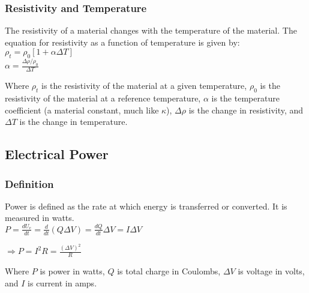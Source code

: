 \subsubsection*{Resistivity and Temperature}

\hspace{.5cm} The resistivity of a material changes with the temperature of the material. The equation for resistivity as a function of temperature is given by:\\

\vbox{
    \center
    $\rho_t = \rho_0[1+\alpha\Delta T]$\\
    \vspace{12pt}
    $\alpha = \frac{\Delta \rho/\rho_0}{\Delta T}$
}
\vspace{12pt}

Where $\rho_t$ is the resistivity of the material at a given temperature, $\rho_0$ is the resistivity of the material at a reference temperature, $\alpha$ is the temperature coefficient (a material constant, much like $\kappa$), $\Delta \rho$ is the change in resistivity, and $\Delta T$ is the change in temperature.\\

\vspace{12pt}
\hrulefill

\begin{center}
\subsection*{Electrical Power}
\end{center}

\subsubsection*{Definition}
\hspace{.5cm} Power is defined as the rate at which energy is transferred or converted. It is measured in watts.\\
\vbox{
    \center
    $P = \frac{dU_e}{dt} = \frac{d}{dt} (Q\Delta V) = \frac{dQ}{dt}\Delta V = I\Delta V$
}

\vbox{
    \center
    $\Longrightarrow P = I^2R = \frac{(\Delta V)^2}{R}$
}
\vspace{12pt}

Where $P$ is power in watts, $Q$ is total charge in Coulombs, $\Delta V$ is voltage in volts, and $I$ is current in amps.